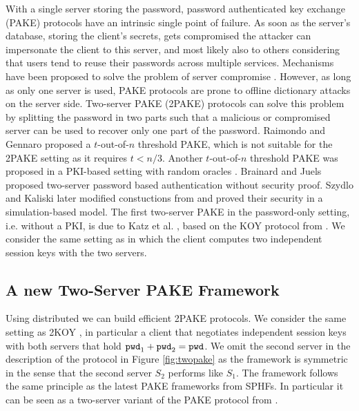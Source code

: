 With a single server storing the password, password authenticated key exchange (PAKE) protocols have an intrinsic single point of failure.
As soon as the server's database, storing the client's secrets, gets compromised the attacker can impersonate the client to this server, and most likely also to others considering that users tend to reuse their passwords across multiple services.
Mechanisms have been proposed to solve the problem of server compromise \cite{Gentry2006,rfc2945}.
However, as long as only one server is used, PAKE protocols are prone to offline dictionary attacks on the server side.
Two-server PAKE (2PAKE) protocols can solve this problem by splitting the password in two parts such that a malicious or compromised server can be used to recover only one part of the password.
Raimondo and Gennaro \cite{Raimondo_Gennaro_2003} proposed a $t$-out-of-$n$ threshold PAKE, which is not suitable for the 2PAKE setting as it requires $t<n/3$.
Another $t$-out-of-$n$ threshold PAKE was proposed in a PKI-based setting with random oracles \cite{MacKenzie_Shrimpton_Jakobsson_2002}.
Brainard and Juels \cite{Brainard_Juels_2003} proposed two-server password based authentication without security proof.
Szydlo and Kaliski \cite{Szydlo_Kaliski_2005} later modified constuctions from \cite{Brainard_Juels_2003} and proved their security in a simulation-based model.
The first two-server PAKE in the password-only setting, i.e. without a PKI, is due to Katz et al. \cite{Katz_MacKenzie_Taban_Gligor_2005}, based on the KOY protocol from \cite{Katz_Ostrovsky_Yung_2001}.
We consider the same setting as \cite{Katz_MacKenzie_Taban_Gligor_2005} in which the client computes two independent session keys with the two servers.

\subsection{A new Two-Server PAKE Framework}
Using distributed \SPHFF we can build efficient 2PAKE protocols.
We consider the same setting as 2KOY \cite{Katz_MacKenzie_Taban_Gligor_2005}, in particular a client that negotiates independent session keys with both servers that hold $\mathtt{pwd}_1+\mathtt{pwd}_2=\mathtt{pwd}$.
We omit the second server in the description of the protocol in Figure \ref{fig:twopake} as the framework is symmetric in the sense that the second server $S_2$ performs like $S_1$.
The framework follows the same principle as the latest PAKE frameworks from SPHFs.
In particular it can be seen as a two-server variant of the PAKE protocol from \cite{Katz2011}.

